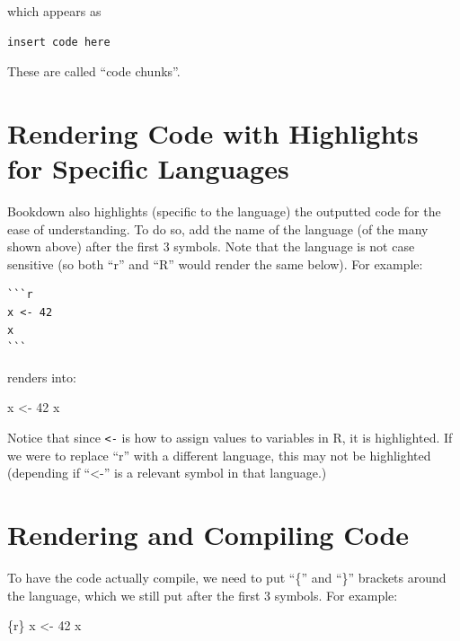 \documentclass[
]{book}
\newenvironment{Shaded}{\begin{snugshade}}{\end{snugshade}}
\newcommand{\DecValTok}[1]{\textcolor[rgb]{0.00,0.00,0.81}{#1}}
\newcommand{\NormalTok}[1]{#1}
\newcommand{\OtherTok}[1]{\textcolor[rgb]{0.56,0.35,0.01}{#1}}
\theoremstyle{definition}
\theoremstyle{definition}
\theoremstyle{definition}
\theoremstyle{definition}
\theoremstyle{remark}
\begin{document}
which appears as

\begin{verbatim}
insert code here
\end{verbatim}

These are called ``code chunks''.

\section{Rendering Code with Highlights for Specific Languages}\label{rendering-code-with-highlights-for-specific-languages}

Bookdown also highlights (specific to the language) the outputted code for the ease of understanding. To do so, add the name of the language (of the many shown above) after the first 3 \texttt{\textasciigrave{}} symbols. Note that the language is not case sensitive (so both ``r'' and ``R'' would render the same below). For example:

\begin{verbatim}
```r
x <- 42
x
```
\end{verbatim}

renders into:

\begin{Shaded}
\begin{Highlighting}[]
\NormalTok{x }\OtherTok{\textless{}{-}} \DecValTok{42}
\NormalTok{x}
\end{Highlighting}
\end{Shaded}

Notice that since \texttt{\textless{}-} is how to assign values to variables in R, it is highlighted. If we were to replace ``r'' with a different language, this may not be highlighted (depending if ``\textless-'' is a relevant symbol in that language.)

\section{Rendering and Compiling Code}\label{rendering-and-compiling-code}

To have the code actually compile, we need to put ``\{'' and ``\}'' brackets around the language, which we still put after the first 3 \texttt{\textasciigrave{}} symbols. For example:

\begin{Shaded}
\begin{Highlighting}[]
\NormalTok{\textasciigrave{}\textasciigrave{}\textasciigrave{}\{r\}}
\NormalTok{x \textless{}{-} 42}
\NormalTok{x}
\NormalTok{\textasciigrave{}\textasciigrave{}\textasciigrave{}}
\end{Highlighting}
\end{Shaded}
\end{document}
